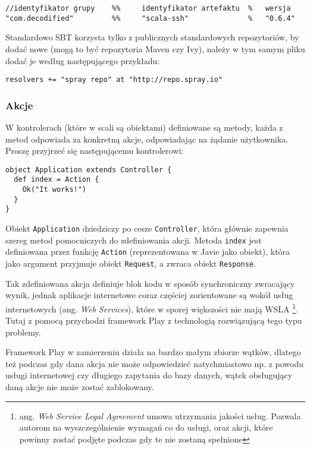 \begin{lstlisting}
//identyfikator grupy    %%     identyfikator artefaktu  %   wersja
"com.decodified"         %%     "scala-ssh"              %   "0.6.4"
\end{lstlisting}

Standardowo SBT korzysta tylko z publicznych standardowych repozytoriów, by dodać nowe (mogą to być repozytoria Maven czy Ivy), należy w tym samym pliku dodać je według następującego przykładu:

\begin{lstlisting}
resolvers += "spray repo" at "http://repo.spray.io"
\end{lstlisting}

\subsubsection{Akcje}

W kontrolerach (które w scali są obiektami) definiowane są metody, każda z metod odpowiada za konkretną akcje, odpowiadając na żądanie użytkownika. Proszę przyjrzeć się następującemu kontrolerowi:

\begin{lstlisting}
object Application extends Controller {
  def index = Action {
    Ok("It works!")
  }
}
\end{lstlisting}

Obiekt \lstinline{Application} dziedziczy po cesze \lstinline{Controller}, która głównie zapewnia szereg metod pomocniczych do zdefiniowania akcji. Metoda \lstinline{index} jest definiowana przez funkcję \lstinline{Action} (reprezentowana w Javie jako obiekt), która jako argument przyjmuje obiekt \lstinline{Request}, a zwraca obiekt \lstinline{Response}. 

\par

Tak zdefiniowana akcja definiuje blok kodu w sposób synchroniczny zwracający wynik, jednak aplikacje internetowe coraz częściej zorientowane są wokół usług internetowych (ang. \emph{Web Services}), które w sporej większości nie mają WSLA \footnote{ang. \emph{Web Service Legal Agreement} umowa utrzymania jakości usług. Pozwala autorom na wyszczególnienie wymagań co do usługi, oraz akcji, które powinny zostać podjęte podczas gdy te nie zostaną spełnione}. Tutaj z pomocą przychodzi framework Play z technologią rozwiązującą tego typu problemy.

Framework Play w zamierzeniu działa na bardzo małym zbiorze wątków, dlatego też podczas gdy dana akcja nie może odpowiedzieć natychmiastowo np. z powodu usługi internetowej czy długiego zapytania do bazy danych, wątek obsługujący daną akcje nie może zostać zablokowany. 

